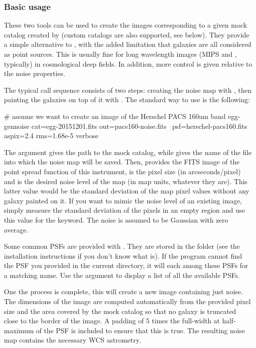 \subsubsection{Basic usage}

These two tools can be used to create the images corresponding to a given mock catalog created by  (custom catalogs are also supported, see below). They provide a simple alternative to \skymaker, with the added limitation that galaxies are all considered as point sources. This is usually fine for long wavelength images (\spitzer MIPS and \herschel, typically) in cosmological deep fields. In addition, more control is given relative to the noise properties.

The typical call sequence consists of two steps: creating the noise map with , then painting the galaxies on top of it with . The standard way to use  is the following:
\begin{bashcode}
# assume we want to create an image of the Herschel PACS 160um band
egg-gennoise cat=egg-20151201.fits out=pacs160-noise.fits \
    psf=herschel-pacs160.fits aspix=2.4 rms=1.68e-5 verbose
\end{bashcode}
The argument  gives the path to the mock catalog, while  gives the name of the file into which the noise map will be saved. Then,  provides the FITS image of the point spread function of this instrument,  is the pixel size (in arcseconds/pixel) and  is the desired noise level of the map (in map units, whatever they are). This latter value would be the standard deviation of the map pixel values without any galaxy painted on it. If you want to mimic the noise level of an existing image, simply measure the standard deviation of the pixels in an empty region and use this value for the  keyword. The noise is assumed to be Gaussian with zero average.

Some common PSFs are provided with \egg. They are stored in the  folder (see the installation instructions if you don't know what  is). If the program cannot find the PSF you provided in the current directory, it will each among these PSFs for a matching name. Use the  argument to display a list of all the available PSFs.

One the process is complete, this will create a new image containing just noise. The dimensions of the image are computed automatically from the provided pixel size and the area covered by the mock catalog so that no galaxy is truncated close to the border of the image. A padding of 5 times the full-width at half-maximum of the PSF is included to ensure that this is true. The resulting noise map contains the necessary WCS astrometry.


